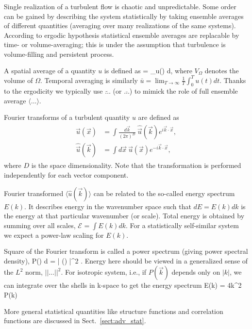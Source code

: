 \documentclass[usenatbib,twocolumn]{aastex63}
\newcommand{\ene}[2]{\mathcal{E}_{#1}^{#2}} %
\begin{document}
Single realization of a turbulent flow is chaotic and unpredictable.
Some order can be gained by describing the system statistically by taking ensemble averages of different quantities (averaging over many realizations of the same systems).
According to ergodic hypothesis statistical ensemble averages are replacable by time- or volume-averaging;
this is under the assumption that turbulence is volume-filling and persistent process.

A spatial average of a quantity $u$ is defined as
\be
{} =  \int_\Omega u() d,
\ee
where $V_\Omega$ denotes the volume of $\Omega$.
Temporal averaging is similarly $\bar{u} = \lim_{T\rightarrow\infty} \frac{1}{T} \int_0^T u(t) dt$.
Thanks to the ergodicity we typically use $\tilde{\ldots}$ (or $\bar{\ldots}$) to mimick the role of full ensemble average $\langle \ldots \rangle$.

Fourier transforms of a turbulent quantity $u$ are defined as
\begin{align}\begin{split}
            \vec{u}(\vec{x}) &= \int \frac{ d\vec{k} }{(2\pi)^D} ~ \hat{\vec{u}}(\vec{k}) e^{i \vec{k} \cdot \vec{x} }, \\
    \hat{ \vec{u}} (\vec{k}) &= \int d\vec{x}~ \vec{u}(\vec{x}) e^{-i \vec{k} \cdot \vec{x} },
\end{split}\end{align}
where $D$ is the space dimensionality.
Note that the transformation is performed independently for each vector component.

Fourier transformed $\langle \hat{u}(\vec{k}) \rangle$ can be related to the so-called energy spectrum $E(k)$.
It describes energy in the wavenumber space such that $dE = E(k) dk$ is the energy at that particular wavenumber (or scale).
Total energy is obtained by summing over all scales, $\ene{}{} = \int E(k) dk$.
For a statistically self-similar system we expect a power-law scaling for $E(k)$.

Square of the Fourier transform is called a power spectrum (giving power spectral density),
\be
P() d = \langle | () |^2 \rangle.
\ee
Energy here should be viewed in a generalized sense of the $L^2$ norm, $||\ldots||^2$.
For isotropic system, i.e., if $P(\vec{k})$ depends only on $|k|$, we can integrate over the shells in k-space to get the energy spectrum
\be
E(k) = 4\pi k^2 P(k)
\ee

More general statistical quantities like structure functions and correlation functions are discussed in Sect.~\ref{sect:adv_stat}.
\end{document}
